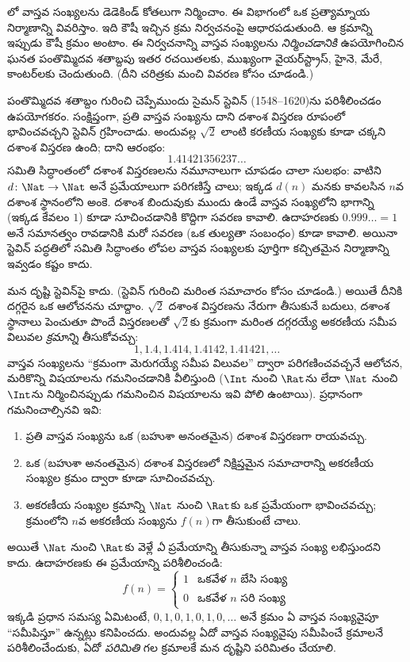 \documentclass[../../../include/open-logic-section]{subfiles}
\begin{document}


లో వాస్తవ సంఖ్యలను డెడెకిండ్ కోతలుగా నిర్మించాం.
ఈ విభాగంలో ఒక ప్రత్యామ్నాయ నిర్మాణాన్ని వివరిస్తాం. ఇది కౌషీ ఇచ్చిన క్రమ నిర్వచనంపై
ఆధారపడుతుంది. ఆ క్రమాన్ని ఇప్పుడు కౌషీ క్రమం అంటాం. ఈ
నిర్వచనాన్ని వాస్తవ సంఖ్యలను \emph{నిర్మించడానికి} ఉపయోగించిన ఘనత
పంతొమ్మిదవ శతాబ్దపు ఇతర రచయితలకు, ముఖ్యంగా వైయర్‌స్ట్రాస్, హైనె,
మేరే, కాంటర్‌లకు చెందుతుంది. (దీని చరిత్రకు మంచి వివరణ కోసం
\citeauthor{OConnorRobertson:RN} \citeyear{OConnorRobertson:RN} చూడండి.)

పంతొమ్మిదవ శతాబ్దం గురించి చెప్పేముందు సైమన్ స్టెవిన్ (1548--1620)ను
పరిశీలించడం ఉపయోగకరం. సంక్షిప్తంగా, ప్రతి వాస్తవ సంఖ్యను దాని దశాంశ
విస్తరణ రూపంలో భావించవచ్చని స్టెవిన్ గ్రహించాడు. అందువల్ల $\sqrt{2}$
లాంటి కరణీయ సంఖ్యకు కూడా చక్కని దశాంశ విస్తరణ ఉంది; దాని ఆరంభం:
\[
	1.41421356237\ldots
\]
సమితి సిద్ధాంతంలో దశాంశ విస్తరణలను నమూనాలుగా చూపడం చాలా సులభం: వాటిని
$d \colon \Nat \to \Nat$ అనే ప్రమేయాలుగా పరిగణిస్తే చాలు; ఇక్కడ
$d(n)$ మనకు కావలసిన $n$వ దశాంశ స్థానంలోని అంకె. దశాంశ బిందువుకు ముందు ఉండే
వాస్తవ సంఖ్యలోని భాగాన్ని (ఇక్కడ కేవలం $1$) కూడా సూచించడానికి కొద్దిగా
సవరణ కావాలి. ఉదాహరణకు $0.999\ldots = 1$ అనే సమానత్వం రావడానికి మరో
సవరణ (ఒక తుల్యతా సంబంధం) కూడా కావాలి. అయినా స్టెవిన్ పద్ధతిలో సమితి
సిద్ధాంతం లోపల వాస్తవ సంఖ్యలకు పూర్తిగా కచ్చితమైన నిర్మాణాన్ని ఇవ్వడం
కష్టం కాదు.

మన దృష్టి స్టెవిన్‌పై కాదు. (స్టెవిన్ గురించి మరింత సమాచారం కోసం
\citealt{KatzKatz2012} చూడండి.) అయితే దీనికి దగ్గరైన ఒక ఆలోచనను చూద్దాం.
$\sqrt{2}$ దశాంశ విస్తరణను నేరుగా తీసుకునే బదులు, దశాంశ స్థానాలు పెంచుతూ
పొందే విస్తరణలతో $\sqrt{2}$కు క్రమంగా మరింత దగ్గరయ్యే అకరణీయ
సమీప విలువల \emph{క్రమాన్ని} తీసుకోవచ్చు:
\[
1, 1.4, 1.414, 1.4142, 1.41421,\ldots
\]
వాస్తవ సంఖ్యలను ``క్రమంగా మెరుగయ్యే సమీప విలువల'' ద్వారా
పరిగణించవచ్చనే ఆలోచన, మరికొన్ని విషయాలను గమనించడానికి వీలిస్తుంది
($\Int$ నుంచి $\Rat$ను లేదా $\Nat$ నుంచి $\Int$ను నిర్మించినప్పుడు
గమనించిన విషయాలను ఇవి పోలి ఉంటాయి). ప్రధానంగా గమనించాల్సినవి ఇవి:
\begin{enumerate}
	\item ప్రతి వాస్తవ సంఖ్యను ఒక (బహుశా అనంతమైన) దశాంశ విస్తరణగా
	రాయవచ్చు.
	\item ఒక (బహుశా అనంతమైన) దశాంశ విస్తరణలో నిక్షిప్తమైన సమాచారాన్ని
	అకరణీయ సంఖ్యల క్రమం ద్వారా కూడా సూచించవచ్చు.
	\item అకరణీయ సంఖ్యల క్రమాన్ని $\Nat$ నుంచి $\Rat$కు ఒక ప్రమేయంగా
	భావించవచ్చు; క్రమంలోని $n$వ అకరణీయ సంఖ్యను $f(n)$గా తీసుకుంటే చాలు.
\end{enumerate}
అయితే $\Nat$ నుంచి $\Rat$కు వెళ్లే \emph{ఏ} ప్రమేయాన్ని తీసుకున్నా
వాస్తవ సంఖ్య లభిస్తుందని కాదు. ఉదాహరణకు ఈ ప్రమేయాన్ని పరిశీలించండి:
\[
	f(n) =\begin{cases}
			1 & \text{ఒకవేళ }n\text{ బేసి సంఖ్య}\\
			0 &\text{ఒకవేళ }n\text{ సరి సంఖ్య}
		\end{cases}
\]
ఇక్కడి ప్రధాన సమస్య ఏమిటంటే, $0,1,0,1,0,1,0,\ldots$ అనే క్రమం ఏ
వాస్తవ సంఖ్యవైపూ ``సమీపిస్తూ'' ఉన్నట్లు కనిపించదు. అందువల్ల ఏదో
వాస్తవ సంఖ్యవైపు సమీపించే క్రమాలనే పరిశీలించేందుకు, ఏదో
\emph{పరిమితి} గల క్రమాలకే మన దృష్టిని పరిమితం చేయాలి.
\end{document}
